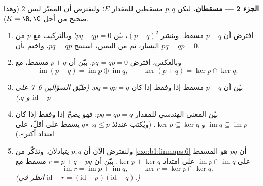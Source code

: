 \begin{problem}
\medskip
\noindent\textbf{الجزء 2 --- مسقطان.} ليكن $p, q$
مسقطين للمقدار $E$؛ ولنفترض أن المميّز ليس $2$ (وهذا صحيح
من أجل $K = \R, \C$).
\begin{enumerate}[resume]
  \item افترض أن $p + q$ مسقط. وبنشر $(p + q)^2$،
        بيّن $pq + qp = 0$؛ وبالتركيب مع $p$ من اليسار، ثم
        من اليمين، استنتج $pq = qp$، واختم بأن $pq = qp =
        0$.
  \item وبالعكس، افترض $pq = qp = 0$. بيّن أن $p + q$
        مسقط، مع
        \[
        \operatorname{im}(p + q) = \operatorname{im} p \oplus
        \operatorname{im} q,
        \qquad
        \ker(p + q) = \ker p \cap \ker q .
        \]
  \item بيّن أن $p - q$ مسقط إذا وفقط إذا كان $pq = qp
        = q$. \emph{(طبّق السؤالين 6--7 على $\mathrm{id} - p$
        و $q$.)}
  \item بيّن المعنى الهندسي للمقدار $pq = qp = q$: فهو يصحّ إذا
        وفقط إذا كان $\operatorname{im} q \subseteq
        \operatorname{im} p$ و $\ker p \subseteq \ker q$. (ويُكتب
        عندئذ $q \leq p$: «$q$ يسقط على أقلّ، على امتداد
        أكثر».)
  \item ولنفترض الآن أن $p, q$ يتبادلان. وتذكّر من
        \cref{exo:b1:linmaps:6} أن $pq$ هو المسقط على
        $\operatorname{im} p \cap \operatorname{im} q$ على امتداد
        $\ker p + \ker q$. بيّن أن $r = p + q - pq$
        مسقط مع
        \[
        \operatorname{im} r = \operatorname{im} p +
        \operatorname{im} q,
        \qquad
        \ker r = \ker p \cap \ker q .
        \]
        \emph{(انظر في $\mathrm{id} - r = (\mathrm{id} -
        p)(\mathrm{id} - q)$.)}
\end{enumerate}


\end{problem}
